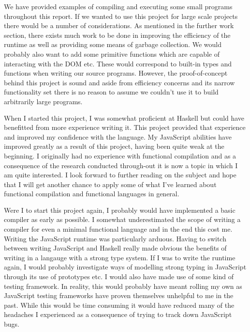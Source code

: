 We have provided examples of compiling and executing some small
programs throughout this report. If we wanted to use this project
for large scale projects there would be a number of considerations.
As mentioned in the further work section, there exists much work
to be done in improving the efficiency of the runtime as well
as providing some means of garbage collection. We would probably
also want to add some primitive functions which are capable of
interacting with the DOM etc. These would correspond to built-in
types and functions when writing our source programs. However,
the proof-of-concept behind this project is sound and aside from
efficiency concerns and its narrow functionality set there is
no reason to assume we couldn't use it to build arbitrarily large
programs.

When I started this project, I was somewhat proficient at Haskell
but could have benefitted from more experience writing
it. This project provided that experience and improved my
confidence with the language. My JavaScript abilities have
improved greatly as a result of this project, having been quite
weak at the beginning. I originally had no experience with functional
compilation and as a consequence of the research conducted through-out
it is now a topic in which I am quite interested. I look forward
to further reading on the subject and hope that I will get another
chance to apply some of what I've learned about functional compilation
and functional languages in general. 

Were I to start this project again, I probably would have implemented
a basic compiler as early as possible. I somewhat underestimated the
scope of writing a compiler for even a minimal functional language
and in the end this cost me. Writing the JavaScript runtime was 
particularly arduous. Having to switch between writing JavaScript
and Haskell really made obvious the benefits of writing in a 
langauge with a strong type system. If I was to write the runtime
again, I would probably investigate ways of modelling strong
typing in JavaScript through its use of prototypes etc. I would
also have made use of some kind of testing framework. In reality,
this would probably have meant rolling my own as JavaScript testing
frameworks have proven themselves unhelpful to me in the past. While
this would be time consuming it would have reduced many of the
headaches I experienced as a consequence of trying to track down
JavaScript bugs. 
